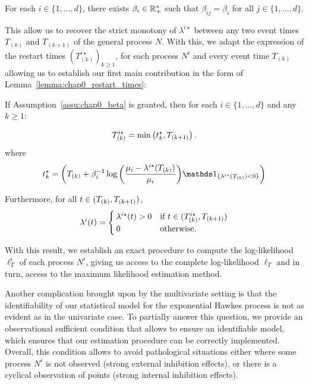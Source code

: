     \begin{assumption}\label{assu:chap0_beta}
      For each $i\in\{1,\ldots, d\}$, there exists $\beta_i\in\RR_+^*$ such that $\beta_{ij} = \beta_i$ for all $j\in\{1,\ldots, d\}$.
    \end{assumption}
    This allow us to recover the strict monotony of $\lambda^{i\star}$ between any two event times $T_{(k)}$ and $T_{(k+1)}$ of the general process $N$.
    With this, we adapt the expression of the restart times $(T_{(k)}^{i\star})_{k\geq 1}$, for each process $N^i$ and every event time $T_{(k)}$ allowing us to establish our first main contribution in the form of Lemma~\ref{lemma:chap0_restart_times}:

    \begin{lemma}\label{lemma:chap0_restart_times}
      If Assumption~\ref{assu:chap0_beta} is granted, then for each $i\in\{1,\ldots, d\}$ and any $k\geq1$: 
  
      \begin{equation}\label{eq:chap0_restart_times_exponential}
          T\park^{i\star} = \min{\adaptedpar{t^\star_k, T\park[k+1]}}\,.
      \end{equation}
      where
      \[t^\star_k = \adaptedpar{T\park + \beta_i^{-1}\log{\adaptedpar{\frac{\mu_i - \lambda^{i\star}(T\park)}{\mu_i}}}\II_{\{\lambda^{i\star}(T\park) < 0\}}}\]
  
      Furthermore,
      for all \(t \in (T\park, T\park[k+1])\),
      \[
        \lambda^i(t) =
        \begin{cases}
          \lambda^{i\star}(t) > 0 & \text{if } t \in (T\park^{i\star}, T\park[k+1])\\
          0 & \text{otherwise}.
        \end{cases}
      \]
      \end{lemma}

      With this result, we establish an exact procedure to compute the log-likelihood $\ell_T^i$ of each process $N^i$, giving us access to the complete log-likelihood $\ell_T$ and in turn, access to the maximum likelihood estimation method.
      
      Another complication brought upon by the multivariate setting is that the identifiability of our statistical model for the exponential Hawkes process is not as evident as in the univariate case.
      To partially answer this question, we provide an observational sufficient condition that allows to ensure an identifiable model, which ensures that our estimation procedure can be correctly implemented.
      Overall, this condition allows to avoid pathological situations either where some process $N^i$ is not observed (strong external inhibition effects), or there is a cyclical observation of points (strong internal inhibition effects).


